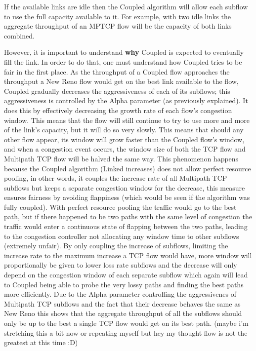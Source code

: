 If the available links are idle then the Coupled algorithm will allow each
subflow to use the full capacity available to it. For example, with two idle
links the aggregate throughput of an MPTCP flow will be the capacity of both
links combined.


However, it is important to understand \textbf{why} Coupled is expected to
eventually fill the link. In order to do that, one must understand how Coupled
tries to be fair in the first place. As the throughput of a Coupled flow
approaches the throughput a New Reno flow would get on the best link available
to the flow, Coupled gradually decreases the aggressiveness of each of its
subflows; this aggressiveness is controlled by the Alpha parameter (as
previously explained). It does this by effectively decreasing the growth rate of
each flow's congestion window. This means that the flow will still continue to
try to use more and more of the link's capacity, but it will do so very slowly.
This means that should any other flow appear, its window will grow faster than
the Coupled flow's window, and when a congestion event occurs, the window size
of both the TCP flow and Multipath TCP flow will be halved the same way. This
phenomenon happens because the Coupled algorithm (Linked increases) does not
allow perfect resource pooling, in other words, it couples the increase rate of
all Multipath TCP subflows but keeps a separate congestion window for the
decrease, this measure ensures fairness by avoiding flappiness (which would be
seen if the algorithm was fully coupled). With perfect resource pooling the
traffic would go to the best path, but if there happened to be two paths with
the same level of congestion the traffic would enter a continuous state of
flapping between the two paths, leading to the congestion controller not
allocating any window time to other subflows (extremely unfair). By only
coupling the increase of subflows, limiting the increase rate to the maximum
increase a TCP flow would have, more window will proportionally be given to
lower loss rate subflows and the decrease will only depend on the congestion
window of each separate subflow which again will lead to Coupled being able to
probe the very lossy paths and finding the best paths more efficiently.  Due to
the Alpha parameter controlling the aggressivenes of Multipath TCP subflows and
the fact that their decrease behaves the same as New Reno this shows that the
aggregate throughput of all the subflows should only be up to the best a single
TCP flow would get on its best path. (maybe i'm stretching this a bit now or
repeating myself but hey my thought flow is not the greatest at this
time :D)  %

